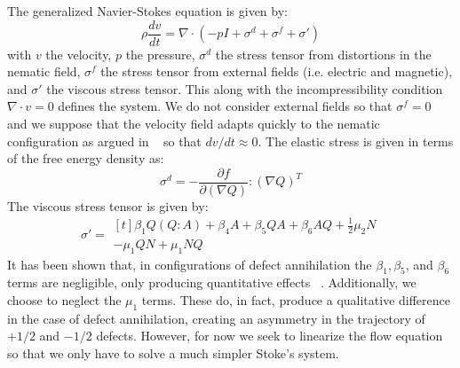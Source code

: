 \documentclass[reqno]{article}
\begin{document}
  The generalized Navier-Stokes equation is given by:
  \begin{equation}
    \rho \frac{dv}{dt}
    =
    \nabla \cdot \left(
      -p I
      + \sigma^d
      + \sigma^f
      + \sigma'
    \right)
  \end{equation}
  with $v$ the velocity, $p$ the pressure, $\sigma^d$ the stress tensor from
  distortions in the nematic field,
  $\sigma^f$ the stress tensor from external fields (i.e. electric and
  magnetic), and $\sigma'$ the viscous stress tensor.
  This along with the incompressibility condition $\nabla \cdot v = 0$ defines
  the system.
  We do not consider external fields so that $\sigma^f = 0$ and we suppose that
  the velocity field adapts quickly to the nematic configuration as argued in
  ~\cite{svensek_complex_2002} so that $dv/dt \approx 0$.
  The elastic stress is given in terms of the free energy density as:
  \begin{equation}
    \sigma^d
    =
    - \frac{\partial f}{\partial (\nabla Q)} : \left( \nabla Q \right)^T
  \end{equation}
  The viscous stress tensor is given by:
  \begin{equation} \label{eq:viscous-stress-tensor}
    \sigma'
    =
    \begin{multlined}[t]
      \beta_1 Q \left( Q : A \right)
      + \beta_4 A
      + \beta_5 QA
      + \beta_6 AQ
      + \frac12 \mu_2 N \\
      - \mu_1 QN + \mu_1 NQ
    \end{multlined}
  \end{equation}
  It has been shown that, in configurations of defect annihilation the $\beta_1,
  \beta_5$, and $\beta_6$ terms are negligible, only producing quantitative
  effects ~\cite{svensek_hydrodynamics_2002}.
  Additionally, we choose to neglect the $\mu_1$ terms.
  These do, in fact, produce a qualitative difference in the case of defect
  annihilation, creating an asymmetry in the trajectory of $+1/2$ and $-1/2$
  defects.
  However, for now we seek to linearize the flow equation so that we only have
  to solve a much simpler Stoke's system.
\end{document}
